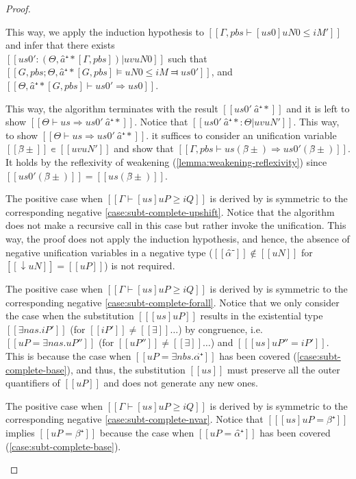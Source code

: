 \begin{proof}
\begin{caseof}
       This way, we apply the induction hypothesis to $[[Γ, pbs ⊢ [us0]uN0 ≤ iM' ]]$ and 
       infer that there exists\\
        $[[us0' :  (Θ, â⁺*[Γ, pbs]) | uv uN0]]$ such that
       $[[G, pbs; Θ, â⁺*[G, pbs] ⊨ uN0 ≤ iM ⫤ us0']]$,
       and $[[Θ, â⁺*[G, pbs] ⊢ us0' ⇒ us0]]$.

       This way, the algorithm terminates with the result $[[us0' \ {â⁺*}]]$
       and it is left to show $[[ Θ ⊢ us ⇒ us0' \ {â⁺*} ]]$. Notice that
       $[[us0' \ {â⁺*} : Θ | uv uN' ]]$. This way, to show $[[ Θ ⊢ us ⇒ us0' \
       {â⁺*} ]]$. it suffices to consider an unification variable $[[β̂±]] ∊
       [[uv uN']]$ and show that $[[Γ, pbs ⊢ us(β̂±) ⇒ us0'(β̂±)]]$. It holds by the
       reflexivity of weakening (\cref{lemma:weakening-reflexivity}) since
       $[[us0'(β̂±)]] = [[us(β̂±)]]$.

       \item The positive case when $[[Γ ⊢ [us]uP ≥ iQ]]$ is derived by 
       \ruleref{\ottdruleDOneShiftDLabel} is symmetric to the corresponding negative
        \cref{case:subt-complete-upshift}. Notice that the algorithm does not 
        make a recursive call in this case but rather invoke the unification.
        This way, the proof does not apply the induction hypothesis, and hence, 
        the absence of negative unification variables in a negative type
        ($[[α̂⁻]] \notin [[uN]]$ for $[[↓uN]] =[[uP]]$) is not required.

      \item The positive case when $[[Γ ⊢ [us]uP ≥ iQ]]$ is derived by 
      \ruleref{\ottdruleDOneExistsLabel} is symmetric to the corresponding negative
      \cref{case:subt-complete-forall}. Notice that we only consider the case
      when the substitution $[[ [us]uP ]]$ results in the existential type 
      $[[∃nas.iP']]$ (for $[[iP']] \neq [[∃]]\dots$) by congruence, 
      i.e. $[[uP = ∃nas.uP'']]$ (for $[[uP'']] \neq [[∃]]\dots$) and $[[ [us]uP'' = iP' ]]$.
      This is because the case when $[[uP = ∃nbs.α̂⁺]]$ has been covered
      (\cref{case:subt-complete-base}), and thus, the substitution $[[us]]$ must
      preserve all the outer quantifiers of $[[uP]]$ and does not generate any new ones.

      \item The positive case when $[[Γ ⊢ [us]uP ≥ iQ]]$ is derived by 
      \ruleref{\ottdruleDOnePVarLabel} is symmetric to the corresponding negative
      \cref{case:subt-complete-nvar}.
      Notice that $[[ [us]uP = β⁺ ]]$ 
      implies $[[uP = β⁺]]$ because the case when $[[uP = α̂⁺]]$ has been covered 
      (\cref{case:subt-complete-base}).
    \end{caseof}
\end{proof}


